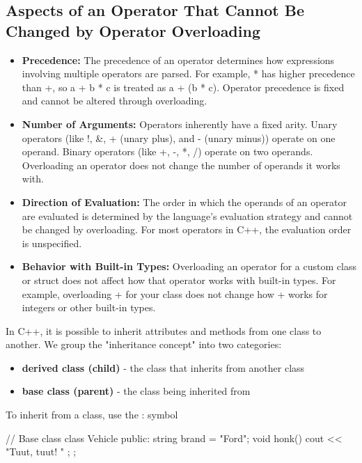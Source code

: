 \documentclass{report}
\begin{document}
\begin{concept}
    \subsection{Aspects of an Operator That Cannot Be Changed by Operator Overloading}
    \begin{itemize}
        \item \textbf{Precedence:} The precedence of an operator determines how expressions involving multiple operators are parsed. For example, * has higher precedence than +, so a + b * c is treated as a + (b * c). Operator precedence is fixed and cannot be altered through overloading.
        \item \textbf{Number of Arguments:} Operators inherently have a fixed arity. Unary operators (like !, &, + (unary plus), and - (unary minus)) operate on one operand. Binary operators (like +, -, *, /) operate on two operands. Overloading an operator does not change the number of operands it works with.
        \item \textbf{Direction of Evaluation:} The order in which the operands of an operator are evaluated is determined by the language's evaluation strategy and cannot be changed by overloading. For most operators in C++, the evaluation order is unspecified.
        \item \textbf{Behavior with Built-in Types:} Overloading an operator for a custom class or struct does not affect how that operator works with built-in types. For example, overloading + for your class does not change how + works for integers or other built-in types.
    \end{itemize}
    




    \pagebreak
    \bigbreak \noindent 
    \begin{concept}
       In C++, it is possible to inherit attributes and methods from one class to another. We group the "inheritance concept" into two categories:
       \begin{itemize}
           \item \textbf{derived class (child)} - the class that inherits from another class
           \item \textbf{base class (parent)} - the class being inherited from
       \end{itemize}
       To inherit from a class, use the : symbol
    \end{concept}
    \bigbreak \noindent 
    \begin{cppcode}
// Base class
class Vehicle {
  public:
    string brand = "Ford";
    void honk() {
      cout << "Tuut, tuut! \n" ;
    }
};


\end{cppcode}
\end{concept}
\end{document}

